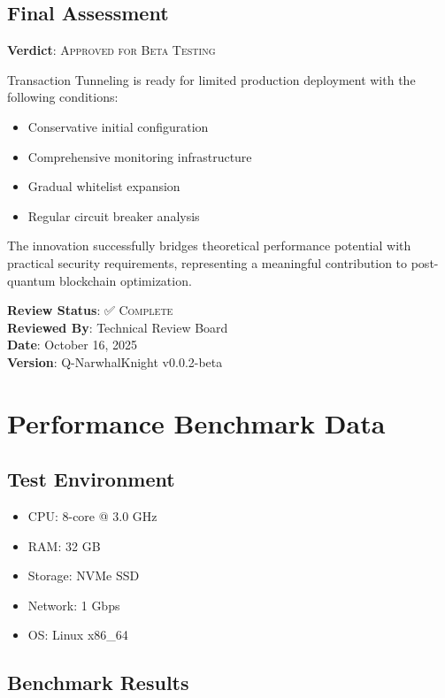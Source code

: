 \documentclass[11pt,a4paper]{article}
\begin{document}
\subsection{Final Assessment}

\textbf{Verdict}: \textsc{Approved for Beta Testing}

Transaction Tunneling is ready for limited production deployment with the following conditions:
\begin{itemize}
    \item Conservative initial configuration
    \item Comprehensive monitoring infrastructure
    \item Gradual whitelist expansion
    \item Regular circuit breaker analysis
\end{itemize}

The innovation successfully bridges theoretical performance potential with practical security requirements, representing a meaningful contribution to post-quantum blockchain optimization.

\vspace{1em}

\noindent\textbf{Review Status}: ✅ \textsc{Complete}\\
\textbf{Reviewed By}: Technical Review Board\\
\textbf{Date}: October 16, 2025\\
\textbf{Version}: Q-NarwhalKnight v0.0.2-beta

\newpage
\appendix

\section{Performance Benchmark Data}

\subsection{Test Environment}
\begin{itemize}
    \item CPU: 8-core @ 3.0 GHz
    \item RAM: 32 GB
    \item Storage: NVMe SSD
    \item Network: 1 Gbps
    \item OS: Linux x86\_64
\end{itemize}

\subsection{Benchmark Results}
\end{document}
